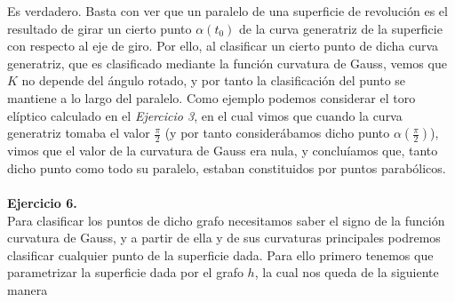 \documentclass[fleqn]{article}
\begin{document}
    Es verdadero. Basta con ver que un paralelo de una superficie de revolución es el resultado de girar un cierto punto $\alpha(t_0)$ de la curva generatriz de la superficie con respecto
    al eje de giro. Por ello, al clasificar un cierto punto de dicha curva generatriz, que es clasificado mediante la función curvatura de Gauss, vemos que $K$ no depende del ángulo rotado,
    y por tanto la clasificación del punto se mantiene a lo largo del paralelo. Como ejemplo podemos considerar el toro elíptico calculado en el \textit{Ejercicio 3}, en el cual vimos que 
    cuando la curva generatriz tomaba el valor $\frac{\pi}{2}$ (y por tanto considerábamos dicho punto $\alpha(\frac{\pi}{2})$), vimos que el valor de la curvatura de Gauss era nula, y concluíamos
    que, tanto dicho punto como todo su paralelo, estaban constituidos por puntos parabólicos. \\ \\

    \textbf{Ejercicio 6. } \\

    Para clasificar los puntos de dicho grafo necesitamos saber el signo de la función curvatura de Gauss, y a partir de ella y de sus curvaturas principales podremos clasificar cualquier punto
    de la superficie dada. Para ello primero tenemos que parametrizar la superficie dada por el grafo $h$, la cual nos queda de la siguiente manera
\end{document}
